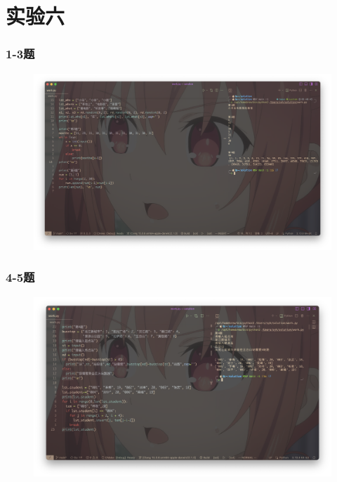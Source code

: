 \documentclass{beamer}
\begin{document}
  \section{实验六}
  \begin{frame}[fragile]
    \frametitle{1-3题}
    \begin{figure}[!htb] %
      \includegraphics[width=1\textwidth,height=0.8\textheight]{./graph/python-trial-6.1-6.3.png} %
    \end{figure}
  \end{frame}
  \begin{frame}[fragile]
    \frametitle{4-5题}
    \begin{figure}[!htb] %
      \includegraphics[width=1\textwidth,height=0.8\textheight]{./graph/python-trial-6.4-6.5.png} %
    \end{figure}
  \end{frame}
\end{document}
